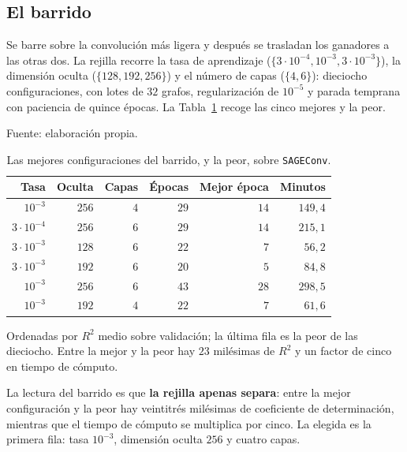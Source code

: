 \subsection*{El barrido}

Se barre sobre la convolución más ligera y después se trasladan los ganadores a las otras dos.
La rejilla recorre la tasa de aprendizaje ($\{3\cdot10^{-4}, 10^{-3}, 3\cdot10^{-3}\}$), la
dimensión oculta ($\{128, 192, 256\}$) y el número de capas ($\{4, 6\}$): dieciocho
configuraciones, con lotes de $32$ grafos, regularización de $10^{-5}$ y parada temprana con
paciencia de quince épocas. La Tabla~\ref{tab:barrido_gnn} recoge las cinco mejores y la peor.

\begin{table}[htbp]
    \centering
    \caption{Las mejores configuraciones del barrido, y la peor, sobre \texttt{SAGEConv}.}
    \label{tab:barrido_gnn}
    {\footnotesize
    Fuente: elaboración propia. \begin{tabular}{@{}rrrrrr@{}}
        \toprule
        \textbf{Tasa} & \textbf{Oculta} & \textbf{Capas} & \textbf{Épocas}
            & \textbf{Mejor época} & \textbf{Minutos} \\
        \midrule
        $10^{-3}$        & $256$ & $4$ & $29$ & $14$ & $149{,}4$ \\
        $3\cdot10^{-4}$  & $256$ & $6$ & $29$ & $14$ & $215{,}1$ \\
        $3\cdot10^{-3}$  & $128$ & $6$ & $22$ & $7$  & $56{,}2$ \\
        $3\cdot10^{-3}$  & $192$ & $6$ & $20$ & $5$  & $84{,}8$ \\
        $10^{-3}$        & $256$ & $6$ & $43$ & $28$ & $298{,}5$ \\
        \midrule
        $10^{-3}$        & $192$ & $4$ & $22$ & $7$  & $61{,}6$ \\
        \bottomrule
    \end{tabular}}

    {\footnotesize Ordenadas por $R^2$ medio sobre validación; la
    última fila es la peor de las dieciocho. Entre la mejor y la peor hay $23$ milésimas de
    $R^2$ y un factor de cinco en tiempo de cómputo.}
\end{table}

La lectura del barrido es que \textbf{la rejilla apenas separa}: entre la mejor configuración y
la peor hay veintitrés milésimas de coeficiente de determinación, mientras que el tiempo de
cómputo se multiplica por cinco. La elegida
es la primera fila: tasa $10^{-3}$, dimensión oculta $256$ y cuatro capas.

